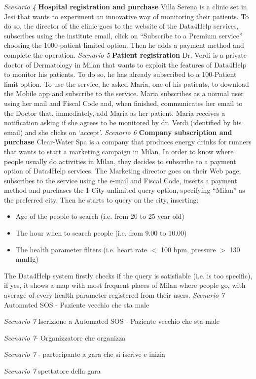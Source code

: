 \vspace{2mm} \newline
\noindent \emph{Scenario 4} \textbf{Hospital registration and purchase } \newline
Villa Serena is a clinic set in Jesi that wants to experiment an innovative way of monitoring their patients. To do so, the director of the clinic goes to the website of the Data4Help services, subscribes using the institute email, click on “Subscribe to a Premium service” choosing the 1000-patient limited option. Then he adds a payment method and complete the operation.
\vspace{2mm} \newline
\noindent \emph{Scenario 5} \textbf{Patient registration} \newline
Dr. Verdi is a private doctor of Dermatology in Milan that wants to exploit the features of Data4Help to monitor his patients. To do so, he has already subscribed to a 100-Patient limit option. To use the service, he asked Maria, one of his patients, to download the Mobile app and subscribe to the service.
Maria subscribes as a normal user using her mail and Fiscal Code and, when finished, communicates her email to the Doctor that, immediately, add Maria as her patient. Maria receives a notification asking if she agrees to be monitored by dr. Verdi (identified by his email) and she clicks on ‘accept’.
\vspace{2mm}\newline
\noindent \emph{Scenario 6} \textbf{Company subscription and purchase} \newline
Clear-Water Spa is a company that produces energy drinks for runners that wants to start a marketing campaign in Milan. In order to know where people usually do activities in Milan, they decides to subscribe to a payment option of Data4Help services. The Marketing director goes on their Web page, subscribes to the service using the e-mail and Fiscal Code, inserts a payment method and purchases the 1-City unlimited query option, specifying “Milan” as the preferred city.
Then he starts to query on the city, inserting:
\begin{itemize}
    \item Age of the people to search (i.e. from 20 to 25 year old)
    \item The hour when to search people (i.e. from 9.00 to 10.00)
    \item The health parameter filters (i.e. heart rate $<$ 100 bpm, pressure $>$ 130 mmHg)
\end{itemize}
 The Data4Help system firstly checks if the query is satisfiable (i.e. is too specific), if yes, it shows a map with most frequent places of Milan where people go, with average of every health parameter registered from their users.
\vspace{2mm} \newline
\noindent \emph{Scenario 7} Automated SOS - Paziente vecchio che sta male

\noindent \emph{Scenario 7} Iscrizione a Automated SOS - Paziente vecchio che sta male

\noindent \emph{Scenario 7}- Organizzatore che organizza

\noindent \emph{Scenario 7} - partecipante a gara  che si iscrive e inizia

\noindent \emph{Scenario 7} spettatore della gara

